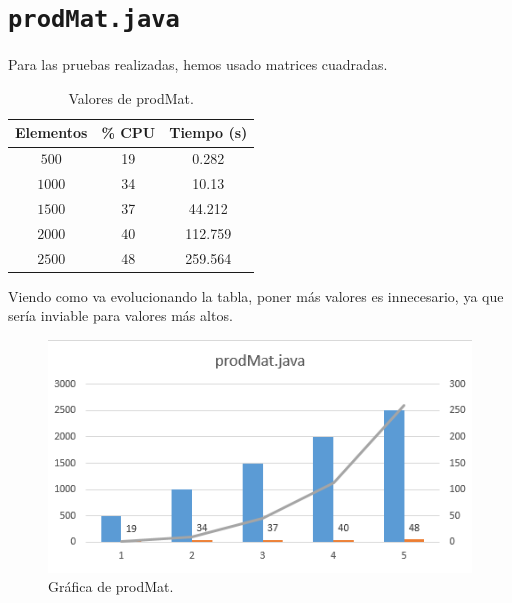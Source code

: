 \documentclass[12pt,letterpaper]{article}
\begin{document}
\newpage
\section{\texttt{prodMat.java}}
\noindent
Para las pruebas realizadas, hemos usado matrices cuadradas.
\begin{center}
	\begin{table}[htbp]
		\begin{center}
			\begin{tabular}{|c|c|c|}
				\hline
				\textbf{Elementos} & \textbf{\% CPU} & \textbf{Tiempo (s)}  \\
				\hline 
				$500$ & 19 & 0.282\\ \hline	
				$1000$ & 34 & 10.13\\ \hline
				$1500$ & 37 & 44.212\\ \hline
				$2000$ & 40 & 112.759\\ \hline
				$2500$ & 48 & 259.564\\ \hline
			\end{tabular}
			\caption{Valores de prodMat.}
			\label{tabla:Valores de prodMat}
		\end{center}
	\end{table}
\end{center}
\noindent
Viendo como va evolucionando la tabla, poner más valores es innecesario, ya que sería inviable para valores más altos.
\begin{figure}
	\begin{center}
		\includegraphics[scale=1]{prodMat.png}
		\caption{Gráfica de prodMat.}
		\label{fig: prodMat}
	\end{center}	
\end{figure}


\newpage
\end{document}
